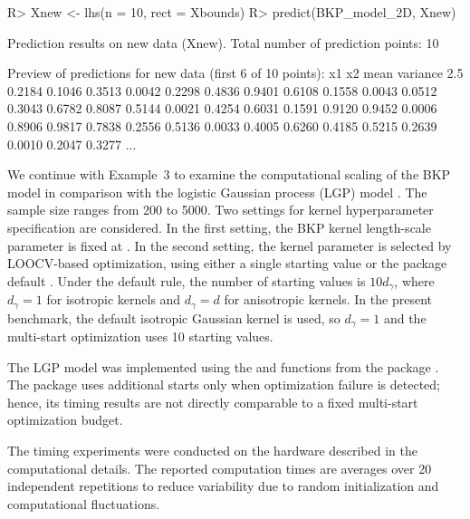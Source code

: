 \documentclass[article, shortnames]{jss}
\newcommand{\fct}[1]{\code{#1()}}
\begin{document}
\begin{CodeChunk}
\begin{CodeInput}
R> Xnew <- lhs(n = 10, rect = Xbounds)
R> predict(BKP_model_2D, Xnew)
\end{CodeInput}
\begin{CodeOutput}
Prediction results on new data (Xnew).
Total number of prediction points: 10 

Preview of predictions for new data (first 6 of 10 points):
     x1     x2   mean variance 2.5%
 0.2184 0.1046 0.3513   0.0042        0.2298         0.4836
 0.9401 0.6108 0.1558   0.0043        0.0512         0.3043
 0.6782 0.8087 0.5144   0.0021        0.4254         0.6031
 0.1591 0.9120 0.9452   0.0006        0.8906         0.9817
 0.7838 0.2556 0.5136   0.0033        0.4005         0.6260
 0.4185 0.5215 0.2639   0.0010        0.2047         0.3277
 ...
\end{CodeOutput}
\end{CodeChunk} 

We continue with Example~3 to examine the computational scaling of the BKP model in comparison with the logistic Gaussian process (LGP) model \citep{Rasmussen2006GPML}. 
The sample size ranges from 200 to 5000. 
Two settings for kernel hyperparameter specification are considered. 
In the first setting, the BKP kernel length-scale parameter is fixed at . 
In the second setting, the kernel parameter is selected by LOOCV-based optimization, using either a single starting value  or the package default . 
Under the default rule, the number of starting values is $10d_\gamma$, where $d_\gamma = 1$ for isotropic kernels and $d_\gamma = d$ for anisotropic kernels. 
In the present benchmark, the default isotropic Gaussian kernel is used, so $d_\gamma = 1$ and the multi-start optimization uses 10 starting values.

The LGP model was implemented using the \fct{gp\_fit} and \fct{gp\_optim} functions from the  package \citep{Piironen2022gplite}. 
The  package uses additional starts only when optimization failure is detected; hence, its timing results are not directly comparable to a fixed multi-start optimization budget.

The timing experiments were conducted on the hardware described in the computational details.
The reported computation times are averages over 20 independent repetitions to reduce variability due to random initialization and computational fluctuations.
\end{document}
